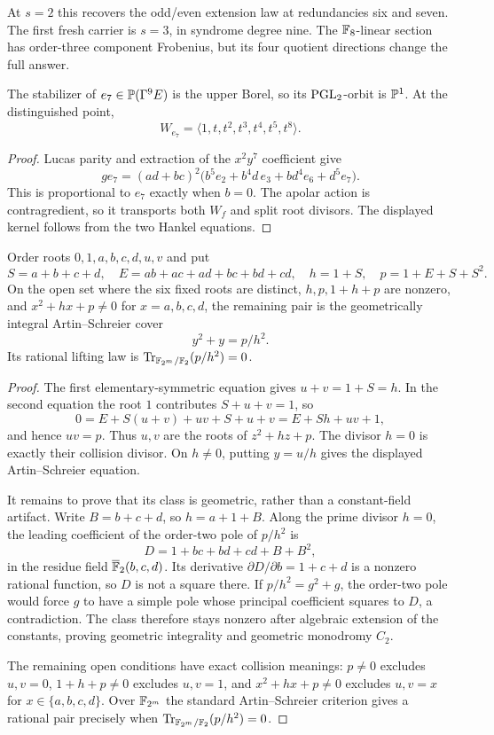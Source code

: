 At $s=2$ this recovers the odd/even extension law at redundancies six
and seven.  The first fresh carrier is $s=3$, in syndrome degree nine.
The $\mathbb F_8$-linear section has order-three component Frobenius, but its
four quotient directions change the full answer.

\begin{proposition}\label{prop:e7-orbit}%
%
The stabilizer of $e_7\in\mathbb P(\Gamma^9E)$ is the upper Borel, so its
$\operatorname{PGL}_2$-orbit is $\mathbb P^1$.  At the distinguished point,
\[
W_{e_7}=\langle1,t,t^2,t^3,t^4,t^5,t^8\rangle.
\]
\end{proposition}

\begin{proof}
Lucas parity and extraction of the $x^2y^7$ coefficient give
\[
g e_7=(ad+bc)^2
\bigl(b^5e_2+b^4d\,e_3+bd^4e_6+d^5e_7\bigr).
\]
This is proportional to $e_7$ exactly when $b=0$.  The apolar action is
contragredient, so it transports both $W_f$ and split root divisors.
The displayed kernel follows from the two Hankel equations.
\end{proof}

\begin{proposition}
\label{prop:e7-as}%
%
Order roots $0,1,a,b,c,d,u,v$ and put
\[
S=a+b+c+d,\quad E=ab+ac+ad+bc+bd+cd,\quad
h=1+S,\quad p=1+E+S+S^2.
\]
On the open set where the six fixed roots are distinct,
$h,p,1+h+p$ are nonzero, and
$x^2+hx+p\ne0$ for $x=a,b,c,d$, the remaining pair is the
geometrically integral Artin--Schreier cover
\[
       y^2+y=p/h^2.
\]
Its rational lifting law is
$\operatorname{Tr}_{\mathbb F_{2^m}/\mathbb F_2}(p/h^2)=0$.
\end{proposition}

\begin{proof}
The first elementary-symmetric equation gives
$u+v=1+S=h$.  In the second equation the root $1$ contributes
$S+u+v=1$, so
\[
 0=E+S(u+v)+uv+S+u+v
   =E+Sh+uv+1,
\]
and hence $uv=p$.  Thus $u,v$ are the roots of
$z^2+hz+p$.  The divisor $h=0$ is exactly their collision divisor.
On $h\ne0$, putting $y=u/h$ gives the displayed
Artin--Schreier equation.

It remains to prove that its class is geometric, rather than a
constant-field artifact.  Write $B=b+c+d$, so $h=a+1+B$.  Along the
prime divisor $h=0$, the leading coefficient of the order-two pole of
$p/h^2$ is
\[
D=1+bc+bd+cd+B+B^2,
\]
in the residue field $\overline{\mathbb F}_2(b,c,d)$.  Its derivative
$\partial D/\partial b=1+c+d$ is a nonzero rational function, so $D$
is not a square there.  If $p/h^2=g^2+g$, the order-two pole would
force $g$ to have a simple pole whose principal coefficient squares
to $D$, a contradiction.  The class therefore stays nonzero after
algebraic extension of the constants, proving geometric integrality
and geometric monodromy $C_2$.

The remaining open conditions have exact collision meanings:
$p\ne0$ excludes $u,v=0$, $1+h+p\ne0$ excludes $u,v=1$, and
$x^2+hx+p\ne0$ excludes $u,v=x$ for
$x\in\{a,b,c,d\}$.  Over $\mathbb F_{2^m}$ the standard
Artin--Schreier criterion gives a rational pair precisely when
$\operatorname{Tr}_{\mathbb F_{2^m}/\mathbb F_2}(p/h^2)=0$.
\end{proof}

